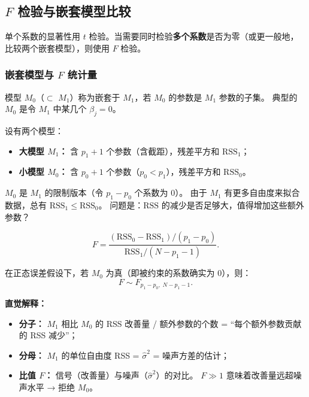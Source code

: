 \subsection{$F$ 检验与嵌套模型比较}

单个系数的显著性用 $t$ 检验。当需要同时检验\textbf{多个系数}是否为零（或更一般地，
比较两个嵌套模型），则使用 $F$ 检验。

\subsubsection{嵌套模型与 $F$ 统计量}

\begin{definition}
模型 $M_0$（$\subset$ $M_1$）称为嵌套于 $M_1$，若 $M_0$ 的参数是 $M_1$ 参数的子集。
典型的 $M_0$ 是令 $M_1$ 中某几个 $\beta_j = 0$。
\end{definition}

设有两个模型：
\begin{itemize}
    \item \textbf{大模型 $M_1$：} 含 $p_1+1$ 个参数（含截距），残差平方和 $\mathrm{RSS}_1$；
    \item \textbf{小模型 $M_0$：} 含 $p_0+1$ 个参数（$p_0 < p_1$），残差平方和 $\mathrm{RSS}_0$。
\end{itemize}

$M_0$ 是 $M_1$ 的限制版本（令 $p_1 - p_0$ 个系数为 0）。
由于 $M_1$ 有更多自由度来拟合数据，总有 $\mathrm{RSS}_1 \le \mathrm{RSS}_0$。
问题是：$\mathrm{RSS}$ 的减少是否足够大，值得增加这些额外参数？

\begin{definition}[$F$ 统计量]
\begin{equation}\label{eq:F_stat}
    \boxed{F = \frac{(\mathrm{RSS}_0 - \mathrm{RSS}_1) / (p_1 - p_0)}
                     {\mathrm{RSS}_1 / (N - p_1 - 1)}}.
\end{equation}
\end{definition}

\begin{theorem}[$F$ 统计量的分布]
在正态误差假设下，若 $M_0$ 为真（即被约束的系数确实为 0），则：
\begin{equation}\label{eq:F_dist}
    F \sim F_{p_1 - p_0,\; N - p_1 - 1}.
\end{equation}
\end{theorem}

\textbf{直觉解释：}
\begin{itemize}
    \item \textbf{分子：} $M_1$ 相比 $M_0$ 的 RSS 改善量 / 额外参数的个数 = ``每个额外参数贡献的 RSS 减少''；
    \item \textbf{分母：} $M_1$ 的单位自由度 RSS = $\hat{\sigma}^2$ = 噪声方差的估计；
    \item \textbf{比值 $F$：} 信号（改善量）与噪声（$\hat{\sigma}^2$）的对比。
    $F \gg 1$ 意味着改善量远超噪声水平 → 拒绝 $M_0$。
\end{itemize}

